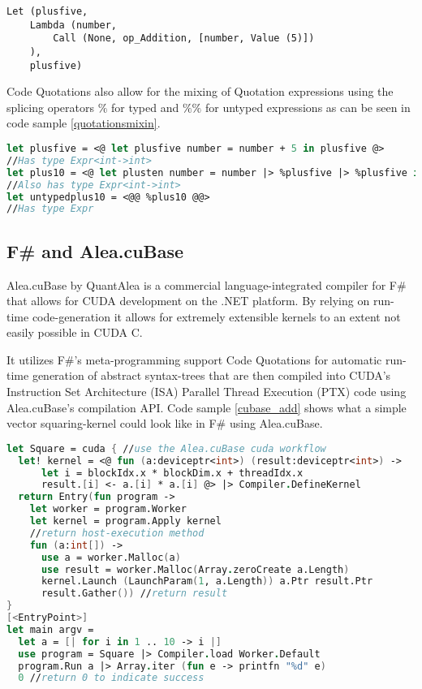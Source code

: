 \begin{lstlisting}[caption=Abstract syntax tree for the example Quotation expression, label=quotationast]
Let (plusfive, 
	Lambda (number, 
		Call (None, op_Addition, [number, Value (5)])
	), 
	plusfive)
\end{lstlisting}

Code Quotations also allow for the mixing of Quotation expressions using the splicing operators $\%$ for typed and $\%\%$ for untyped expressions as can be seen in code sample \ref{quotationsmixin}.

\begin{lstlisting}[caption=Quotation mixing, label=quotationsmixin, language=FSharp]
let plusfive = <@ let plusfive number = number + 5 in plusfive @>
//Has type Expr<int->int>
let plus10 = <@ let plusten number = number |> %plusfive |> %plusfive in plusten @>
//Also has type Expr<int->int>
let untypedplus10 = <@@ %plus10 @@>
//Has type Expr
\end{lstlisting}


\subsection{F\# and Alea.cuBase}\label{subsec:background:fsharpcubase}
Alea.cuBase by QuantAlea\cite{quantalea} is a commercial language-integrated compiler for F\# that allows for CUDA development on the .NET platform.
By relying on run-time code-generation it allows for extremely extensible kernels to an extent not easily possible in CUDA C.

It utilizes F\#'s meta-programming support Code Quotations for automatic run-time generation of abstract syntax-trees that are then compiled into CUDA's Instruction Set Architecture (ISA) Parallel Thread Execution (PTX) code using Alea.cuBase's compilation API.
Code sample \ref{cubase_add} shows what a simple vector squaring-kernel could look like in F\# using Alea.cuBase.

\begin{lstlisting}[caption=Alea.cuBase square kernel, label=cubase_add, language=FSharp]
let Square = cuda { //use the Alea.cuBase cuda workflow
  let! kernel = <@ fun (a:deviceptr<int>) (result:deviceptr<int>) ->
      let i = blockIdx.x * blockDim.x + threadIdx.x
      result.[i] <- a.[i] * a.[i] @> |> Compiler.DefineKernel
  return Entry(fun program ->
    let worker = program.Worker
    let kernel = program.Apply kernel
    //return host-execution method
    fun (a:int[]) ->
      use a = worker.Malloc(a)
      use result = worker.Malloc(Array.zeroCreate a.Length)
      kernel.Launch (LaunchParam(1, a.Length)) a.Ptr result.Ptr
      result.Gather()) //return result
}
[<EntryPoint>]
let main argv = 
  let a = [| for i in 1 .. 10 -> i |]
  use program = Square |> Compiler.load Worker.Default
  program.Run a |> Array.iter (fun e -> printfn "%d" e)
  0 //return 0 to indicate success
\end{lstlisting}

